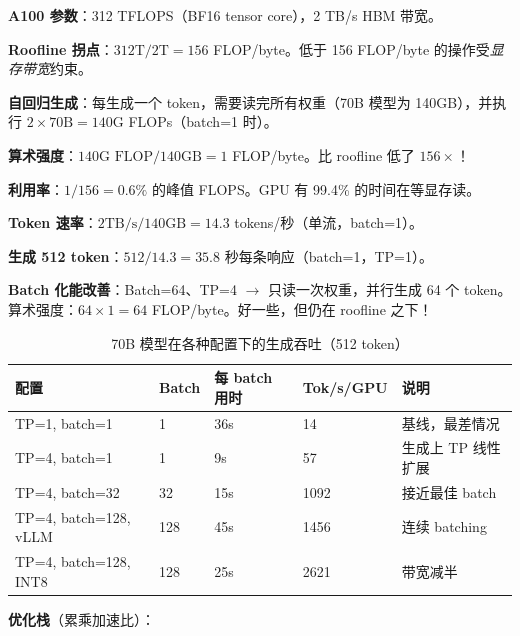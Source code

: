 \begin{intuitionbox}
\textbf{A100 参数}：312 TFLOPS（BF16 tensor core），2 TB/s HBM 带宽。

\textbf{Roofline 拐点}：$312\text{T} / 2\text{T} = 156$ FLOP/byte。低于 156 FLOP/byte 的操作受\emph{显存带宽}约束。

\textbf{自回归生成}：每生成一个 token，需要读完所有权重（70B 模型为 140GB），并执行 $2 \times 70\text{B} = 140\text{G}$ FLOPs（batch=1 时）。

\textbf{算术强度}：$140\text{G FLOP} / 140\text{GB} = 1$ FLOP/byte。比 roofline 低了 $156\times$！

\textbf{利用率}：$1/156 = 0.6\%$ 的峰值 FLOPS。GPU 有 99.4\% 的时间在等显存读。

\textbf{Token 速率}：$2\text{TB/s} / 140\text{GB} = 14.3$ tokens/秒（单流，batch=1）。

\textbf{生成 512 token}：$512 / 14.3 = 35.8$ 秒每条响应（batch=1，TP=1）。

\textbf{Batch 化能改善}：Batch=64、TP=4 $\rightarrow$ 只读一次权重，并行生成 64 个 token。算术强度：$64 \times 1 = 64$ FLOP/byte。好一些，但仍在 roofline 之下！
\end{intuitionbox}

\begin{table}[ht!]
\centering
\caption{70B 模型在各种配置下的生成吞吐（512 token）}
{\footnotesize
\begin{tabularx}{0.88\linewidth}{@{}Z{1.12} l l l Z{0.88}@{}}
\toprule
\textbf{配置} & \textbf{Batch} & \textbf{每 batch 用时} & \textbf{Tok/s/GPU} & \textbf{说明} \\
\midrule
TP=1, batch=1 & 1 & 36s & 14 & 基线，最差情况 \\
TP=4, batch=1 & 1 & 9s & 57 & 生成上 TP 线性扩展 \\
TP=4, batch=32 & 32 & 15s & 1092 & 接近最佳 batch \\
TP=4, batch=128, vLLM & 128 & 45s & 1456 & 连续 batching \\
TP=4, batch=128, INT8 & 128 & 25s & 2621 & 带宽减半 \\
\bottomrule
\end{tabularx}
}
\end{table}

\textbf{优化栈}（累乘加速比）：

